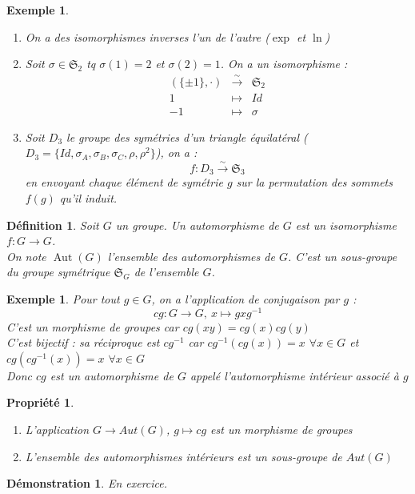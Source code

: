 \documentclass[a4paper, oneside]{report}
\theoremstyle{break}
\newtheorem{defi}[thm]{Définition}
\newtheorem{propr}[thm]{Propriété}
\newtheorem{exem}[thm]{Exemple}
\newtheorem*{demo}{Démonstration}
\newcommand{\mdg}{morphisme de groupes }
\newcommand{\auts}{automorphismes }
\newcommand{\fong}{\overset{\sim}{\rightarrow}}
\renewcommand{\S}{\mathfrak{S}}
\DeclareMathOperator{\Aut}{Aut}
\begin{document}
\begin{exem}
	\begin{enumerate}
		\item On a des isomorphismes inverses l'un de l'autre ($\exp$ et $\ln$)
		\item Soit $\sigma \in \S_2$ tq $\sigma(1)=2$ et $\sigma(2)=1$. On a un isomorphisme :
		$$\begin{array}{lll}
		(\{\pm 1\}, \cdot)&\fong & \S_2\\
		1&\mapsto &Id\\
		-1&\mapsto&\sigma
		\end{array}$$
		
		\item Soit $D_3$ le groupe des symétries d'un triangle équilatéral ($D_3=\{Id, \sigma_A, \sigma_B, \sigma_C, \rho, \rho^2\}$), on a : 
		$$f:D_3 \fong \S_3$$
		en envoyant chaque élément de symétrie $g$ sur la permutation des sommets $f(g)$ qu'il induit.
	\end{enumerate}
\end{exem}

\begin{defi}
	Soit $G$ un groupe. Un automorphisme de $G$ est un isomorphisme $f:G\rightarrow G$.\\
	On note $\Aut(G)$ l'ensemble des automorphismes de $G$. C'est un sous-groupe du groupe symétrique $\S_G$ de l'ensemble $G$.
\end{defi}

\begin{exem}
	Pour tout $g\in G$, on a l'application de conjugaison par $g$ :
	$$cg : G \rightarrow G,~x\mapsto gxg^{-1}$$
	C'est un \mdg  car $cg(xy)=cg(x)cg(y)$\\
	C'est bijectif : sa réciproque est $cg^{-1}$ car $cg^{-1}(cg(x))=x$ $\forall x\in G$ et $cg(cg^{-1}(x)) = x$ $ \forall x\in G$\\
	Donc $cg$ est un automorphisme de $G$ appelé l'automorphisme intérieur associé à $g$
\end{exem}

\begin{propr}
	\begin{enumerate}
		\item L'application $G\rightarrow Aut(G)$, $g\mapsto cg$ est un \mdg
		\item L'ensemble des \auts intérieurs est un sous-groupe de $Aut(G)$
	\end{enumerate}
\end{propr}

\begin{demo}
	En exercice.
\end{demo}
\end{document}
